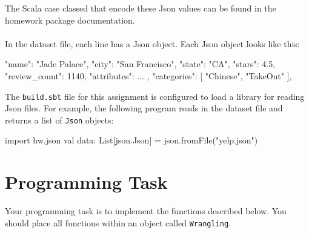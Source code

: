 \noindent The Scala case classed that encode these Json values can be found
in the homework package documentation.
\\ \\
In the dataset file, each line has a Json object. Each Json object looks like
this:
    \begin{scalacode}
    {
        "name": "Jade Palace",
        "city": "San Francisco",
        "state": "CA",
        "stars": 4.5,
        "review_count": 1140,
        "attributes": { ... },
        "categories": [ "Chinese", "TakeOut" ],
    }
    \end{scalacode}
The \texttt{build.sbt} file for this assignment is configured to load a library
for reading Json files. For example, the following program reads in the dataset
file and returns a list of \texttt{Json} objects:
\begin{scalacode}
import hw.json
val data: List[json.Json] = json.fromFile("yelp.json")
\end{scalacode}

\section{Programming Task}

Your programming task is to implement the functions described below. You should
place all functions within an object called \texttt{Wrangling}.

